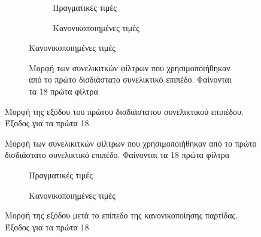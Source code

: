 \begin{figure}[htbp]
    \begin{subfigure}{0.7\textwidth}
        \begin{subfigure}{\textwidth}
            
            \caption{Πραγματικές τιμές}
            \label{fig:subim1}
        \end{subfigure}
        \begin{subfigure}{\textwidth}
            
            \caption{Κανονικοποιημένες τιμές}
            \label{fig:subim1}
        \end{subfigure}
    \end{subfigure}
    \begin{subfigure}{0.3\textwidth}
        
        \caption{Μορφή των συνελικιτκών φίλτρων που χρησιμοποιήθηκαν από το πρώτο δισδιάστατο συνελικτικό επιπέδο. Φαίνονται τα  18 πρώτα φίλτρα}
    \end{subfigure}
    \caption{Μορφή της εξόδου του πρώτου δισδιάστατου συνελικτικού επιπέδου. Έξοδος για τα πρώτα 18 }
\end{figure}

\begin{figure}[H]
  \begin{center}
    
    \caption{Μορφή των συνελικιτκών φίλτρων που χρησιμοποιήθηκαν από το πρώτο δισδιάστατο συνελικτικό επιπέδο. Φαίνονται τα  18 πρώτα φίλτρα}
  \end{center}
\end{figure}

\begin{figure}[htbp]
    \begin{subfigure}{0.5\textwidth}
        
        \caption{Πραγματικές τιμές}
        \label{fig:subim1}
    \end{subfigure}
    \begin{subfigure}{0.5\textwidth}
        
        \caption{Κανονικοποιημένες τιμές}
        \label{fig:subim2}
    \end{subfigure}
    \caption{Μορφή της εξόδου μετά το επίπεδο της κανονικοποίησης παρτίδας. Έξοδος για τα πρώτα 18 }
\end{figure}


